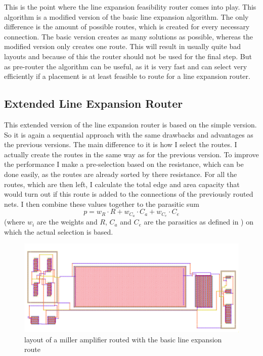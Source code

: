 This is the point where the line expansion feasibility router comes into play. This algorithm is a modified version of the basic line expansion algorithm. The only difference is the amount of possible routes, which is created for every necessary connection. The basic version creates as many solutions as possible, whereas the modified version only creates one route. This will result in usually quite bad layouts and because of this the router should not be used for the final step. But as pre-router the algorithm can be useful, as it is very fast and can select very efficiently if a placement is at least feasible to route for a line expansion router.

\subsection{Extended Line Expansion Router}
This extended version of the line expansion router is based on the simple version. So it is again a sequential approach with the same drawbacks and advantages as the previous versions. The main difference to it is how I select the routes. I actually create the routes in the same way as for the previous version. To improve the performance I make a pre-selection based on the resistance, which can be done easily, as the routes are already sorted by there resistance. For all the routes, which are then left, I calculate the total edge and area capacity that would turn out if this route is added to the connections of the previously routed nets. I then combine these values together to the parasitic sum
\[p = w_R \cdot R + w_{C_a} \cdot C_a + w_{C_e} \cdot C_e\]
(where $w_i$ are the weights and $R$, $C_a$ and $C_e$ are the parasitics as defined in ) on which the actual selection is based.

\begin{figure}
	\centering
	\includegraphics[scale=.4]{FIG/miller_amplifier_routed_extended_line_expansion_2.png}
  	\caption{layout of a miller amplifier routed with the basic line expansion route}
	\label{fig:miller_amplifier_routed_extended_line_expansion_2}
\end{figure}	